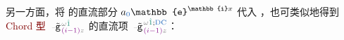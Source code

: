 \begin{subequations}
\begin{align}
	\end{align}
\end{subequations}
另一方面，将  的\textcolor{NavyBlue}{直流部分} $a_{\textcolor{NavyBlue}{0}} \mathbb{e}^{\mathbb{i}{x}}$ 代入 ，也可类似地得到 \textcolor{Maroon}{Chord 型} $\xint{\begin{smallmatrix} ~ \\ {}^{}_{\mathcolor{gray}{-}} \\ ~ \end{smallmatrix}}{09}{\tilde{\mathtt{g}}}^{\;\!\mathcolor{gray}{\omega} \textcolor{PineGreen}{\hat{1}}}_{\;\! \textcolor{Plum}{(i-1)} \mathcolor{gray}{z}}$ 的\textcolor{NavyBlue}{直流项} $\xint{\begin{smallmatrix} ~ \\ {}^{}_{\mathcolor{gray}{-}} \\ ~ \end{smallmatrix}}{09}{\tilde{\mathtt{g}}}^{\;\!\mathcolor{gray}{\omega} \textcolor{PineGreen}{\hat{1}} ;\text{\textcolor{NavyBlue}{DC}} }_{\;\! \textcolor{Plum}{(i-1)} \mathcolor{gray}{z}}$：
